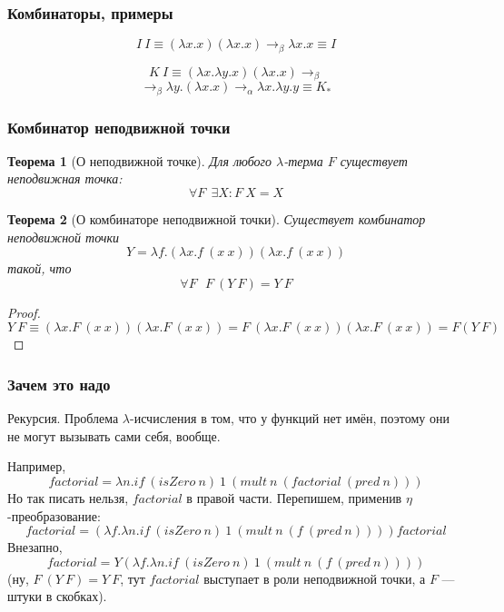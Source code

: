 \documentclass[xetex,mathserif,serif]{beamer}
\newtheorem{rustheorem}{Теорема}
\begin{document}
    \begin{frame}
        \frametitle{Комбинаторы, примеры}
        $$I\ I \equiv (\lambda x.x) (\lambda x.x) \rightarrow_\beta \lambda x.x \equiv I$$		
                
        $$K\ I \equiv (\lambda x.\lambda y.x) (\lambda x.x) \rightarrow_\beta $$		
        $$\rightarrow_\beta \lambda y.(\lambda x.x) \rightarrow_\alpha \lambda x.\lambda y.y \equiv K_\ast$$		
    \end{frame}

    \begin{frame}
        \frametitle{Комбинатор неподвижной точки}
        \begin{rustheorem}[О неподвижной точке]
            Для любого $\lambda$-терма $F$ существует неподвижная точка:
            $$\forall F\ \ \exists X : F\ X = X$$
            \vspace{-5mm}
        \end{rustheorem}
        \vspace{-5mm}
        \begin{rustheorem}[О комбинаторе неподвижной точки]
            Существует комбинатор неподвижной точки
            $$Y = \lambda f.(\lambda x.f\ (x\ x)) (\lambda x.f\ (x\ x))$$
            такой, что 
            $$\forall F\ \ \ F\ (Y\ F) = Y\ F$$
        \end{rustheorem}
        \vspace{-5mm}
        \begin{proof}
            \vspace{-7mm}
            $$Y\ F \equiv (\lambda x.F\ (x\ x))(\lambda x.F\ (x\ x)) 
                = F\ (\lambda x.F\ (x\ x))(\lambda x.F\ (x\ x)) = F(Y\ F)$$
            \vspace{-10mm}
        \end{proof}
    \end{frame}

    \begin{frame}
        \frametitle{Зачем это надо}
        Рекурсия. Проблема $\lambda$-исчисления в том, что у функций нет имён, поэтому они не могут 
        вызывать сами себя, вообще.
        
        Например,
        $$factorial = \lambda n. if\ (isZero\ n)\ 1\ (mult\ n\ (factorial\ (pred\ n)))$$
        Но так писать нельзя, $factorial$ в правой части. Перепишем, применив $\eta$-преобразование:
        $$factorial = (\lambda f.\lambda n.if\ (isZero\ n)\ 1\ (mult\ n\ (f\ (pred\ n)))) factorial$$
        Внезапно, 
        $$factorial = Y (\lambda f.\lambda n.if\ (isZero\ n)\ 1\ (mult\ n\ (f\ (pred\ n))))$$
        (ну, $F\ (Y\ F) = Y\ F$, тут $factorial$ выступает в роли неподвижной точки, а $F$ --- 
        штуки в скобках).
    \end{frame}
\end{document}
